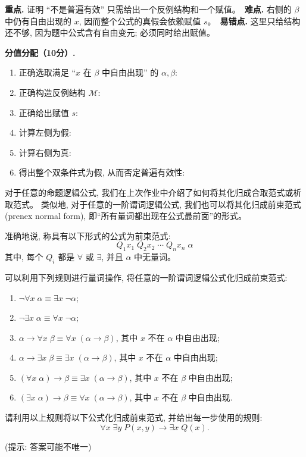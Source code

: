 \documentclass[a4paper, justified]{tufte-handout}
\begin{document}
\begin{solution}
  \begin{remark}
    \textbf{重点.} 证明 ``不是普遍有效'' 只需给出一个反例结构和一个赋值。\
    \textbf{难点.} 右侧的 $\beta$ 中仍有自由出现的 $x$, 因而整个公式的真假会依赖赋值 $s$。\
    \textbf{易错点.} 这里只给结构还不够, 因为题中公式含有自由变元; 必须同时给出赋值。
  \end{remark}

  \textbf{分值分配（10分）.}
  \begin{enumerate}[(1)]
    \item 正确选取满足 ``$x$ 在 $\beta$ 中自由出现'' 的 $\alpha, \beta$: 
    \item 正确构造反例结构 $\mathcal M$: 
    \item 正确给出赋值 $s$: 
    \item 计算左侧为假: \score{2}
    \item 计算右侧为真: \score{2}
    \item 得出整个双条件式为假, 从而否定普遍有效性: \score{1}
  \end{enumerate}
\end{solution}

\newpage
\begin{problem}
  对于任意的命题逻辑公式,
  我们在上次作业中介绍了如何将其化归成合取范式或析取范式。
  类似地, 对于任意的一阶谓词逻辑公式,
  我们也可以将其化归成前束范式 (prenex normal form),
  即``所有量词都出现在公式最前面''的形式。

  准确地说, 称具有以下形式的公式为前束范式:
  \[
    Q_1 x_1\; Q_2 x_2\; \cdots\; Q_n x_n\; \alpha
  \]
  其中, 每个 $Q_i$ 都是 $\forall$ 或 $\exists$,
  并且 $\alpha$ 中无量词。

  可以利用下列规则进行量词操作, 将任意的一阶谓词逻辑公式化归成前束范式:
  \begin{enumerate}[label = \textbf{R\arabic*}]
    \item $\lnot \forall x\; \alpha \equiv \exists x\; \lnot \alpha$;
    \item $\lnot \exists x\; \alpha \equiv \forall x\; \lnot \alpha$;
    \item $\alpha \to \forall x\; \beta \equiv \forall x\; (\alpha \to \beta)$,
      其中 $x$ 不在 $\alpha$ 中自由出现;
    \item $\alpha \to \exists x\; \beta \equiv \exists x\; (\alpha \to \beta)$,
      其中 $x$ 不在 $\alpha$ 中自由出现;
    \item $(\forall x\; \alpha) \to \beta \equiv \exists x\; (\alpha \to \beta)$,
      其中 $x$ 不在 $\beta$ 中自由出现;
    \item $(\exists x\; \alpha) \to \beta \equiv \forall x\; (\alpha \to \beta)$,
      其中 $x$ 不在 $\beta$ 中自由出现.
  \end{enumerate}

  请利用以上规则将以下公式化归成前束范式,
  并给出每一步使用的规则:
  \[
    \forall x\; \exists y\; P(x, y) \to \exists x\; Q(x).
  \]

  (提示: 答案可能不唯一)
\end{problem}
\end{document}
